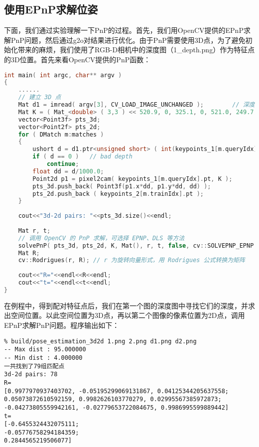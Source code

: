 \subsection{使用EPnP求解位姿}
下面，我们通过实验理解一下PnP的过程。首先，我们用OpenCV提供的EPnP求解PnP问题，然后通过g2o对结果进行优化。由于PnP需要使用3D点，为了避免初始化带来的麻烦，我们使用了RGB-D相机中的深度图（1_depth.png）作为特征点的3D位置。首先来看OpenCV提供的PnP函数：

\begin{lstlisting}[language=c++,caption=slambook/ch7/pose_estimation_3d2d.cpp（片段）]
int main( int argc, char** argv )
{
	......
    // 建立 3D 点
    Mat d1 = imread( argv[3], CV_LOAD_IMAGE_UNCHANGED );        // 深度图为 16 位无符号数，单通道图像
    Mat K = ( Mat_<double> ( 3,3 ) << 520.9, 0, 325.1, 0, 521.0, 249.7, 0, 0, 1 );
    vector<Point3f> pts_3d;
    vector<Point2f> pts_2d;
    for ( DMatch m:matches )
    {
	    ushort d = d1.ptr<unsigned short> ( int(keypoints_1[m.queryIdx].pt.y) )[ int(keypoints_1[m.queryIdx].pt.x) ];
	    if ( d == 0 )   // bad depth
		    continue;
	    float dd = d/1000.0;
	    Point2d p1 = pixel2cam( keypoints_1[m.queryIdx].pt, K );
	    pts_3d.push_back( Point3f(p1.x*dd, p1.y*dd, dd) );
	    pts_2d.push_back ( keypoints_2[m.trainIdx].pt );
    }
    
    cout<<"3d-2d pairs: "<<pts_3d.size()<<endl;
    
    Mat r, t;
    // 调用 OpenCV 的 PnP 求解，可选择 EPNP、DLS 等方法
    solvePnP( pts_3d, pts_2d, K, Mat(), r, t, false, cv::SOLVEPNP_EPNP );
    Mat R; 
    cv::Rodrigues(r, R); // r 为旋转向量形式，用 Rodrigues 公式转换为矩阵
    
    cout<<"R="<<endl<<R<<endl;
    cout<<"t="<<endl<<t<<endl;
}
\end{lstlisting}

在例程中，得到配对特征点后，我们在第一个图的深度图中寻找它们的深度，并求出空间位置。以此空间位置为3D点，再以第二个图像的像素位置为2D点，调用EPnP求解PnP问题。程序输出如下：

\begin{lstlisting}
% build/pose_estimation_3d2d 1.png 2.png d1.png d2.png
-- Max dist : 95.000000 
-- Min dist : 4.000000 
一共找到了79组匹配点
3d-2d pairs: 78
R=
[0.9977970937403702, -0.05195299069131867, 0.04125344205637558;
0.05073872610592159, 0.9982626103770279, 0.02995567385972873;
-0.04273805559942161, -0.02779653722084675, 0.9986995599889442]
t=
[-0.6455324432075111;
-0.05776758294184359;
0.2844565219506077]
\end{lstlisting}

